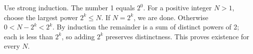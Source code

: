 Use strong induction. The number 1 equals $2^0$. For a positive integer $N>1$, choose the largest power $2^k\le N$. If $N=2^k$, we are done. Otherwise $0<N-2^k<2^k$. By induction the remainder is a sum of distinct powers of 2; each is less than $2^k$, so adding $2^k$ preserves distinctness. This proves existence for every $N$.
